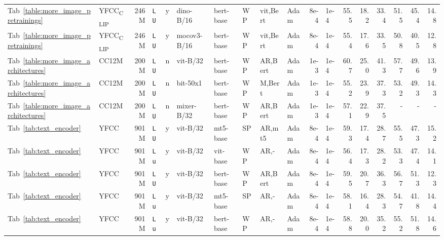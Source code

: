 \documentclass[10pt,twocolumn,letterpaper]{article}
\def \Lu {{\tt Lu}\xspace}
\def \LU {{\tt LU}\xspace}
\begin{document}
\begin{table*}
{\begin{tabular}{@{}llrlll@{\hspace{0.3ex}}llllrlrrrrrr@{}}
    \arrayrulecolor{lightgray}\midrule[0.25pt]\arrayrulecolor{black}
  Tab~\ref{table:more_image_pretrainings} &    YFCC\textsubscript{CLIP} &   246M &  \LU &  y &    dino-B/16 &   bert-base &  WP &  vit,Bert &  Adam & 8e-4 &  1e-4 & 55.5 &            18.2 &            33.4 & 51.5 & 45.4 & 14.8 \\
  Tab~\ref{table:more_image_pretrainings} &    YFCC\textsubscript{CLIP} &   246M &  \LU &  y &  mocov3-B/16 &   bert-base &  WP &  vit,Bert &  Adam & 8e-4 &  1e-4 & 55.4 &            17.6 &            33.5 & 50.8 & 40.5 & 12.8 \\
    \arrayrulecolor{lightgray}\midrule[0.25pt]\arrayrulecolor{black}
 Tab~\ref{table:more_image_architectures} &   CC12M &   200M &  \LU &  n &     vit-B/32 &   bert-base &  WP &   AR,Bert &  Adam & 1e-3 &  1e-4 & 60.7 &            25.0 &            41.3 & 57.7 & 49.6 & 13.9 \\
 Tab~\ref{table:more_image_architectures} &   CC12M &   200M &  \LU &  n &     bit-50x1 &   bert-base &  WP &    M,Bert &  Adam & 1e-3 &  1e-4 & 55.2 &            23.9 &            37.3 & 53.2 & 49.3 & 14.3 \\
 Tab~\ref{table:more_image_architectures} &   CC12M &   200M &  \LU &  n &   mixer-B/32 &   bert-base &  WP &   AR,Bert &  Adam & 1e-3 &  1e-4 & 57.1 &            22.9 &            37.5 &    - &    - &    - \\
    \arrayrulecolor{lightgray}\midrule[0.25pt]\arrayrulecolor{black}
              Tab~\ref{tab:text_encoder} &    YFCC &   901M &  \LU &  y &     vit-B/32 &    mt5-base &  SP &    AR,mt5 &  Adam & 8e-4 &  1e-4 & 59.3 &            17.4 &            28.7 & 55.5 & 47.3 & 15.2 \\
              Tab~\ref{tab:text_encoder} &    YFCC &   901M &  \Lu &  y &     vit-B/32 &    vit-base &  WP &      AR,- &  Adam & 8e-4 &  1e-4 & 56.4 &            17.3 &            28.2 & 53.3 & 47.4 & 14.1 \\
              Tab~\ref{tab:text_encoder} &    YFCC &   901M &  \LU &  y &     vit-B/32 &   bert-base &  WP &   AR,Bert &  Adam & 8e-4 &  1e-4 & 59.5 &            20.7 &            36.3 & 56.7 & 51.3 & 12.3 \\
              Tab~\ref{tab:text_encoder} &    YFCC &   901M &  \Lu &  y &     vit-B/32 &    mt5-base &  SP &      AR,- &  Adam & 8e-4 &  1e-4 & 58.1 &            16.4 &            28.3 & 54.7 & 41.8 & 14.4 \\
              Tab~\ref{tab:text_encoder} &    YFCC &   901M &  \Lu &  y &     vit-B/32 &   bert-base &  WP &      AR,- &  Adam & 8e-4 &  1e-4 & 58.8 &            20.0 &            35.2 & 55.2 & 51.8 & 14.6 \\

\end{tabular}}
\end{table*}
\end{document}
